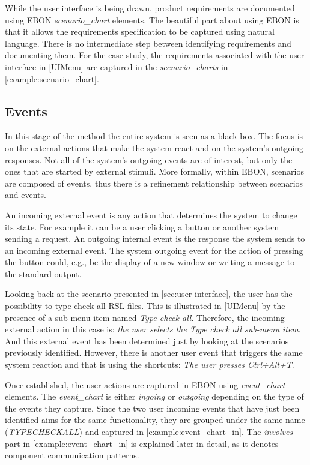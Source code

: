 \documentclass[conference]{IEEEtran}
\newcommand{\eg}{e.g.,\xspace}
\begin{document}
While the user interface is being drawn, product requirements are
documented using EBON \emph{scenario\_chart} elements. The beautiful
part about using EBON is that it allows the requirements specification
to be captured using natural language.  There is no intermediate step
between identifying requirements and documenting them.  For the case
study, the requirements associated with the user interface in
\autoref{UIMenu} are captured in the \emph{scenario\_charts} in
\autoref{example:scenario_chart}.

%
\subsection{Events}
\label{sec:events}

In this stage of the method the entire system is seen as a black
box. The focus is on the external actions that make the system react
and on the system's outgoing responses.  Not all of the system's
outgoing events are of interest, but only the ones that are started by
external stimuli.  More formally, within EBON, scenarios are composed
of events, thus there is a refinement relationship between scenarios
and events.

An incoming external event is any action that determines the system to
change its state. For example it can be a user clicking a button or
another system sending a request.  An outgoing internal event is the
response the system sends to an incoming external event. The system
outgoing event for the action of pressing the button could, \eg be the
display of a new window or writing a message to the standard output.

Looking back at the scenario presented in
\autoref{sec:user-interface}, the user has the possibility to type
check all RSL files. This is illustrated in \autoref{UIMenu} by the
presence of a sub-menu item named \emph{Type check all}. Therefore,
the incoming external action in this case is: \emph{the user selects
the Type check all sub-menu item}. And this external event has been
determined just by looking at the scenarios previously identified.
However, there is another user event that triggers the same system
reaction and that is using the shortcuts: \emph{The user presses
Ctrl+Alt+T}.



Once established, the user actions are captured in EBON using
\emph{event\_chart} elements. The \emph{event\_chart} is either
\emph{ingoing} or \emph{outgoing} depending on the type of the events
they capture.  Since the two user incoming events that have just been
identified aims for the same functionality, they are grouped under the
same name (\emph{TYPECHECKALL}) and captured in
\autoref{example:event_chart_in}.  The \emph{involves} part in
\autoref{example:event_chart_in} is explained later in detail, as it
denotes component communication patterns.
\end{document}
